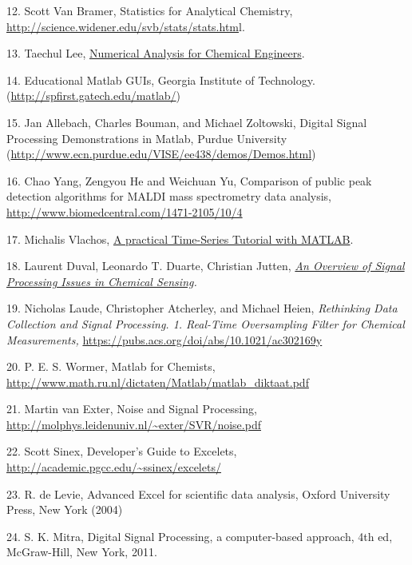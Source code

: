 12. Scott Van Bramer, Statistics for Analytical Chemistry, \href{http://science.widener.edu/svb/stats/stats.html}{http://science.widener.edu/svb/stats/stats.htm}l.

13. Taechul Lee, \href{https://www.cheric.org/files/education/cyberlecture/e200113/e200113-101.pdf}{Numerical Analysis for Chemical Engineers}.

14. Educational Matlab GUIs, Georgia Institute of Technology. (\href{http://users.ece.gatech.edu/mcclella/matlabGUIs/}{http://spfirst.gatech.edu/matlab/})

15. Jan Allebach, Charles Bouman, and Michael Zoltowski, Digital Signal Processing Demonstrations in Matlab, Purdue University (\url{http://www.ecn.purdue.edu/VISE/ee438/demos/Demos.html})

16. Chao Yang, Zengyou He and Weichuan Yu, Comparison of public peak detection algorithms for MALDI mass spectrometry data analysis, \url{http://www.biomedcentral.com/1471-2105/10/4}

17. Michalis Vlachos, \href{http://alumni.cs.ucr.edu/~mvlachos/PKDD05/PKDD05\_Handout.pdf}{A practical Time-Series Tutorial with MATLAB}.

18. Laurent Duval, Leonardo T. Duarte, Christian Jutten, \href{https://pdfs.semanticscholar.org/presentation/a976/389cef473cd218a9ae3204419dfe60112efa.pdf}{\textit{An Overview of Signal Processing Issues in Chemical Sensing}}\textit{.}

19. Nicholas Laude, Christopher Atcherley, and Michael Heien, \textit{Rethinking Data Collection and Signal Processing. 1. Real-Time Oversampling Filter for Chemical Measurements,} \url{https://pubs.acs.org/doi/abs/10.1021/ac302169y}

20. P. E. S. Wormer, Matlab for Chemists, \url{http://www.math.ru.nl/dictaten/Matlab/matlab_diktaat.pdf}

21. Martin van Exter, Noise and Signal Processing, \href{http://www.physics.leidenuniv.nl/sections/cm/ip/Onderwijs/SVR/bestanden/noise-final.pdf}{http://molphys.leidenuniv.nl/\textasciitilde{}exter/SVR/noise.pdf}

22. Scott Sinex, Developer's Guide to Excelets, \url{http://academic.pgcc.edu/~ssinex/excelets/}

23. R. de Levie, Advanced Excel for scientific data analysis, Oxford University Press, New York (2004) 

24. S. K. Mitra, Digital Signal Processing, a computer-based approach, 4th ed, McGraw-Hill, New York, 2011.

